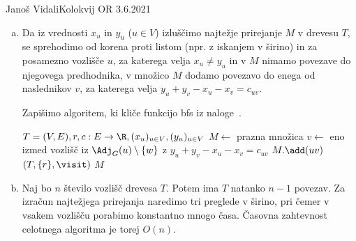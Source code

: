 \begin{naloga}{Janoš Vidali}{Kolokvij OR 3.6.2021}
\begin{odgovor}
\begin{enumerate}[(a)]
\item Da iz vrednosti $x_u$ in $y_u$ ($u \in V$)
izluščimo najtežje prirejanje $M$ v drevesu $T$,
se sprehodimo od korena proti listom (npr. z iskanjem v širino)
in za posamezno vozlišče $u$,
za katerega velja $x_u \ne y_u$
in v $M$ nimamo povezave do njegovega predhodnika,
v množico $M$ dodamo povezavo do enega od naslednikov $v$,
za katerega velja $y_u + y_v - x_u - x_v = c_{uv}$.

Zapišimo algoritem, ki kliče funkcijo {\sc bfs} iz naloge~\res[bfs].
\begin{small}
\begin{algorithmic}
%
        {$T = (V, E), r, c : E \to \R, (x_u)_{u \in V}, (y_u)_{u \in V}$}
    \State $M \gets$ prazna množica
            \State $v \gets$ eno izmed vozlišč iz $\Adj_G(u) \setminus \{w\}$ z $y_u + y_v - x_u - x_v = c_{uv}$
            \State $M.\add(uv)$
        \EndIf
    \EndFunction
    $(T, \{r\}, \visit)$
    \State \Return $M$
\EndFunction
\end{algorithmic}
\end{small}

\item Naj bo $n$ število vozlišč drevesa $T$.
Potem ima $T$ natanko $n-1$ povezav.
Za izračun najtežjega prirejanja naredimo tri preglede v širino,
pri čemer v vsakem vozlišču porabimo konstantno mnogo časa.
Časovna zahtevnost celotnega algoritma je torej $O(n)$.


\end{enumerate}
\end{odgovor}
\end{naloga}

